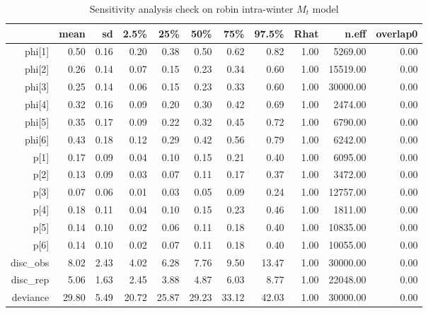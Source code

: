 \begin{table}[ht]
\centering
\begin{tabular}{rrrrrrrrrrr}
  \hline
 & mean & sd & 2.5\% & 25\% & 50\% & 75\% & 97.5\% & Rhat & n.eff & overlap0 \\ 
  \hline
phi[1] & 0.50 & 0.16 & 0.20 & 0.38 & 0.50 & 0.62 & 0.82 & 1.00 & 5269.00 & 0.00 \\ 
  phi[2] & 0.26 & 0.14 & 0.07 & 0.15 & 0.23 & 0.34 & 0.60 & 1.00 & 15519.00 & 0.00 \\ 
  phi[3] & 0.25 & 0.14 & 0.06 & 0.15 & 0.23 & 0.33 & 0.60 & 1.00 & 30000.00 & 0.00 \\ 
  phi[4] & 0.32 & 0.16 & 0.09 & 0.20 & 0.30 & 0.42 & 0.69 & 1.00 & 2474.00 & 0.00 \\ 
  phi[5] & 0.35 & 0.17 & 0.09 & 0.22 & 0.32 & 0.45 & 0.72 & 1.00 & 6790.00 & 0.00 \\ 
  phi[6] & 0.43 & 0.18 & 0.12 & 0.29 & 0.42 & 0.56 & 0.79 & 1.00 & 6242.00 & 0.00 \\ 
  p[1] & 0.17 & 0.09 & 0.04 & 0.10 & 0.15 & 0.21 & 0.40 & 1.00 & 6095.00 & 0.00 \\ 
  p[2] & 0.13 & 0.09 & 0.03 & 0.07 & 0.11 & 0.17 & 0.37 & 1.00 & 3472.00 & 0.00 \\ 
  p[3] & 0.07 & 0.06 & 0.01 & 0.03 & 0.05 & 0.09 & 0.24 & 1.00 & 12757.00 & 0.00 \\ 
  p[4] & 0.18 & 0.11 & 0.04 & 0.10 & 0.15 & 0.23 & 0.46 & 1.00 & 1811.00 & 0.00 \\ 
  p[5] & 0.14 & 0.10 & 0.02 & 0.06 & 0.11 & 0.18 & 0.40 & 1.00 & 10835.00 & 0.00 \\ 
  p[6] & 0.14 & 0.10 & 0.02 & 0.07 & 0.11 & 0.18 & 0.40 & 1.00 & 10055.00 & 0.00 \\ 
  disc\_obs & 8.02 & 2.43 & 4.02 & 6.28 & 7.76 & 9.50 & 13.47 & 1.00 & 30000.00 & 0.00 \\ 
  disc\_rep & 5.06 & 1.63 & 2.45 & 3.88 & 4.87 & 6.03 & 8.77 & 1.00 & 22048.00 & 0.00 \\ 
  deviance & 29.80 & 5.49 & 20.72 & 25.87 & 29.23 & 33.12 & 42.03 & 1.00 & 30000.00 & 0.00 \\ 
   \hline
\end{tabular}
\caption{Sensitivity analysis check on robin intra-winter $M_t$ model} 
\label{tab:sensitivity_analysis_robin_age_intra}
\end{table}
